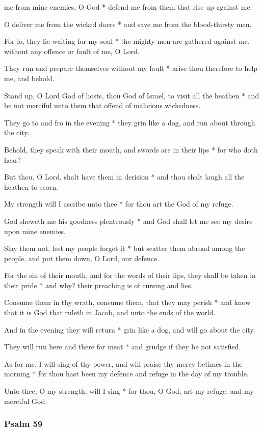  me from mine enemies, O God * defend me from them that rise up against me.

O deliver me from the wicked doers * and save me from the blood-thirsty men.

For lo, they lie waiting for my soul * the mighty men are gathered against me, without any offence or fault of me, O Lord.

They run and prepare themselves without my fault * arise thou therefore to help me, and behold.

Stand up, O Lord God of hosts, thou God of Israel, to visit all the heathen * and be not merciful unto them that offend of malicious wickedness.

They go to and fro in the evening * they grin like a dog, and run about through the city.

Behold, they speak with their mouth, and swords are in their lips * for who doth hear?

But thou. O Lord, shalt have them in derision * and thou shalt laugh all the heathen to scorn.

My strength will I ascribe unto thee * for thou art the God of my refuge.

God sheweth me his goodness plenteously * and God shall let me see my desire upon mine enemies.

Slay them not, lest my people forget it * but scatter them abroad among the people, and put them down, O Lord, our defence.

For the sin of their mouth, and for the words of their lips, they shall be taken in their pride * and why? their preaching is of cursing and lies.

Consume them in thy wrath, consume them, that they may perish * and know that it is God that ruleth in Jacob, and unto the ends of the world.

And in the evening they will return * grin like a dog, and will go about the city.

They will run here and there for meat * and grudge if they be not satisfied.

As for me, I will sing of thy power, and will praise thy mercy betimes in the morning * for thou hast been my defence and refuge in the day of my trouble.

Unto thee, O my strength, will I sing * for thou, O God, art my refuge, and my merciful God.

\subsubsection{Psalm 59}

